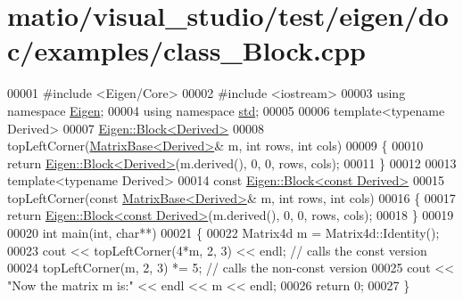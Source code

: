 \hypertarget{matio_2visual__studio_2test_2eigen_2doc_2examples_2class___block_8cpp_source}{}\section{matio/visual\+\_\+studio/test/eigen/doc/examples/class\+\_\+\+Block.cpp}
\label{matio_2visual__studio_2test_2eigen_2doc_2examples_2class___block_8cpp_source}

\begin{DoxyCode}
00001 \textcolor{preprocessor}{#include <Eigen/Core>}
00002 \textcolor{preprocessor}{#include <iostream>}
00003 \textcolor{keyword}{using namespace }\hyperlink{namespace_eigen}{Eigen};
00004 \textcolor{keyword}{using namespace }\hyperlink{namespacestd}{std};
00005 
00006 \textcolor{keyword}{template}<\textcolor{keyword}{typename} Derived>
00007 \hyperlink{group___core___module_class_eigen_1_1_block}{Eigen::Block<Derived>}
00008 topLeftCorner(\hyperlink{group___core___module_class_eigen_1_1_matrix_base}{MatrixBase<Derived>}& m, \textcolor{keywordtype}{int} rows, \textcolor{keywordtype}{int} cols)
00009 \{
00010   \textcolor{keywordflow}{return} \hyperlink{group___core___module_class_eigen_1_1_block}{Eigen::Block<Derived>}(m.derived(), 0, 0, rows, cols);
00011 \}
00012 
00013 \textcolor{keyword}{template}<\textcolor{keyword}{typename} Derived>
00014 \textcolor{keyword}{const} \hyperlink{group___core___module_class_eigen_1_1_block}{Eigen::Block<const Derived>}
00015 topLeftCorner(\textcolor{keyword}{const} \hyperlink{group___core___module_class_eigen_1_1_matrix_base}{MatrixBase<Derived>}& m, \textcolor{keywordtype}{int} rows, \textcolor{keywordtype}{int} cols)
00016 \{
00017   \textcolor{keywordflow}{return} \hyperlink{group___core___module_class_eigen_1_1_block}{Eigen::Block<const Derived>}(m.derived(), 0, 0, rows, cols);
00018 \}
00019 
00020 \textcolor{keywordtype}{int} main(\textcolor{keywordtype}{int}, \textcolor{keywordtype}{char}**)
00021 \{
00022   Matrix4d m = Matrix4d::Identity();
00023   cout << topLeftCorner(4*m, 2, 3) << endl; \textcolor{comment}{// calls the const version}
00024   topLeftCorner(m, 2, 3) *= 5;              \textcolor{comment}{// calls the non-const version}
00025   cout << \textcolor{stringliteral}{"Now the matrix m is:"} << endl << m << endl;
00026   \textcolor{keywordflow}{return} 0;
00027 \}
\end{DoxyCode}
